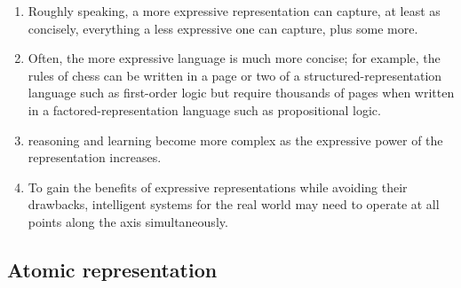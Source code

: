 \begin{enumerate}[itemsep=0.2cm]
    \item Roughly speaking, a more expressive representation can capture, at least as concisely, everything a less expressive one can capture, plus some more. 
    \hfill \cite{ai/book/Artificial-Intelligence-A-Modern-Approach/Russell-Norvig}

    \item Often, the more expressive language is much more concise; for example, the rules of chess can be written in a page or two of a structured-representation language such as first-order logic but require thousands of pages when written in a factored-representation language such as propositional logic.
    \hfill \cite{ai/book/Artificial-Intelligence-A-Modern-Approach/Russell-Norvig}

    \item reasoning and learning become more complex as the expressive power of the representation increases.
    \hfill \cite{ai/book/Artificial-Intelligence-A-Modern-Approach/Russell-Norvig}

    \item To gain the benefits of expressive representations while avoiding their drawbacks, intelligent systems for the real world may need to operate at all points along the axis simultaneously.
    \hfill \cite{ai/book/Artificial-Intelligence-A-Modern-Approach/Russell-Norvig}
\end{enumerate}






\subsection{Atomic representation}

